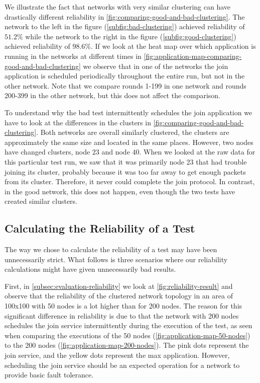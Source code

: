 We illustrate the fact that networks with very similar clustering can have drastically different reliability in \cref{fig:comparing-good-and-bad-clustering}. The network to the left in the figure (\cref{subfig:bad-clustering}) achieved reliability of $51.2\%$ while the network to the right in the figure (\cref{subfig:good-clustering}) achieved reliability of $98.6\%$. If we look at the heat map over which application is running in the networks at different times in \cref{fig:application-map-comparing-good-and-bad-clustering} we observe that in one of the networks the join application is scheduled periodically throughout the entire run, but not in the other network. Note that we compare rounds 1-199 in one network and rounds 200-399 in the other network, but this does not affect the comparison.

To understand why the bad test intermittently schedules the join application we have to look at the differences in the clusters in \cref{fig:comparing-good-and-bad-clustering}. Both networks are overall similarly clustered, the clusters are approximately the same size and located in the same places. However, two nodes have changed clusters, node 23 and node 40. When we looked at the raw data for this particular test run, we saw that it was primarily node 23 that had trouble joining its cluster, probably because it was too far away to get enough packets from its cluster. Therefore, it never could complete the join protocol. In contrast, in the good network, this does not happen, even though the two tests have created similar clusters.

\subsection{Calculating the Reliability of a Test}
The way we chose to calculate the reliability of a test may have been unnecessarily strict. What follows is three scenarios where our reliability calculations might have given unnecessarily bad results.

First, in \cref{subsec:evaluation-reliability} we look at \cref{fig:reliability-result} and observe that the reliability of the clustered network topology in an area of 100x100 with 50 nodes is a lot higher than for 200 nodes. The reason for this significant difference in reliability is due to that the network with 200 nodes schedules the join service intermittently during the execution of the test, as seen when comparing the executions of the 50 nodes (\cref{fig:application-map-50-nodes}) to the 200 nodes (\cref{fig:application-map-200-nodes}). The pink dots represent the join service, and the yellow dots represent the max application. However, scheduling the join service should be an expected operation for a network to provide basic fault tolerance. 
\newpage

